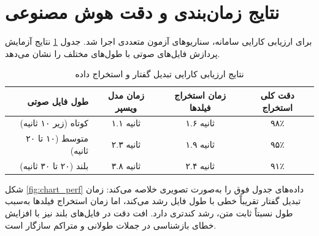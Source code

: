 \documentclass[11pt, a4paper]{report}
\makeatletter
\let\amlak@hline\hline
\let\hline\amlak@hline
\makeatother
\begin{document}
\section{نتایج زمان‌بندی و دقت هوش مصنوعی}
برای ارزیابی کارایی سامانه، سناریوهای آزمون متعددی اجرا شد. جدول \ref{tab:perf_ai} نتایج آزمایش پردازش فایل‌های صوتی با طول‌های مختلف را نشان می‌دهد.

\begin{table}[htbp]
\centering
\caption{نتایج ارزیابی کارایی تبدیل گفتار و استخراج داده}
\label{tab:perf_ai}
\renewcommand{\arraystretch}{1.5}
\begin{tabular}{|r|c|c|c|}
\hline
\textbf{طول فایل صوتی} & \textbf{زمان مدل ویسپر} & \textbf{زمان استخراج فیلدها} & \textbf{دقت کلی استخراج} \\ \hline
کوتاه (زیر ۱۰ ثانیه) & ۱.۱ ثانیه & ۱.۶ ثانیه & ۹۸٪ \\ \hline
متوسط (۱۰ تا ۲۰ ثانیه) & ۲.۳ ثانیه & ۱.۹ ثانیه & ۹۵٪ \\ \hline
بلند (۲۰ تا ۳۰ ثانیه) & ۳.۸ ثانیه & ۲.۴ ثانیه & ۹۱٪ \\ \hline
\end{tabular}
\end{table}

شکل \ref{fig:chart_perf} داده‌های جدول فوق را به‌صورت تصویری خلاصه می‌کند: زمان تبدیل گفتار تقریباً خطی با طول فایل رشد می‌کند، اما زمان استخراج فیلدها به‌سبب طول نسبتاً ثابت متن، رشد کندتری دارد. افت دقت در فایل‌های بلند نیز با افزایش خطای بازشناسی در جملات طولانی و متراکم سازگار است.
\end{document}
